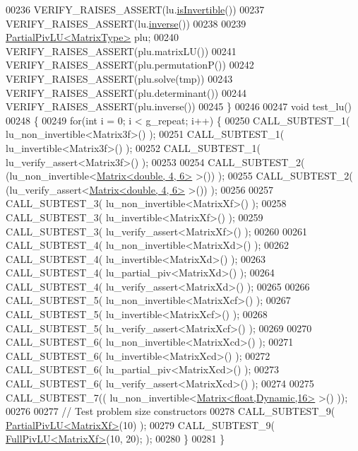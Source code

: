 \begin{DoxyCode}
00236   VERIFY\_RAISES\_ASSERT(lu.\hyperlink{group___l_u___module_afdf2579c93473650f2ef2a47a376c4a0}{isInvertible}())
00237   VERIFY\_RAISES\_ASSERT(lu.\hyperlink{group___l_u___module_ae6f4bb55f859f6353f99cf15ecff4b25}{inverse}())
00238 
00239   \hyperlink{group___l_u___module_class_eigen_1_1_partial_piv_l_u}{PartialPivLU<MatrixType>} plu;
00240   VERIFY\_RAISES\_ASSERT(plu.matrixLU())
00241   VERIFY\_RAISES\_ASSERT(plu.permutationP())
00242   VERIFY\_RAISES\_ASSERT(plu.solve(tmp))
00243   VERIFY\_RAISES\_ASSERT(plu.determinant())
00244   VERIFY\_RAISES\_ASSERT(plu.inverse())
00245 \}
00246 
00247 \textcolor{keywordtype}{void} test\_lu()
00248 \{
00249   \textcolor{keywordflow}{for}(\textcolor{keywordtype}{int} i = 0; i < g\_repeat; i++) \{
00250     CALL\_SUBTEST\_1( lu\_non\_invertible<Matrix3f>() );
00251     CALL\_SUBTEST\_1( lu\_invertible<Matrix3f>() );
00252     CALL\_SUBTEST\_1( lu\_verify\_assert<Matrix3f>() );
00253 
00254     CALL\_SUBTEST\_2( (lu\_non\_invertible<\hyperlink{group___core___module_class_eigen_1_1_matrix}{Matrix<double, 4, 6>} >()) );
00255     CALL\_SUBTEST\_2( (lu\_verify\_assert<\hyperlink{group___core___module_class_eigen_1_1_matrix}{Matrix<double, 4, 6>} >()) );
00256 
00257     CALL\_SUBTEST\_3( lu\_non\_invertible<MatrixXf>() );
00258     CALL\_SUBTEST\_3( lu\_invertible<MatrixXf>() );
00259     CALL\_SUBTEST\_3( lu\_verify\_assert<MatrixXf>() );
00260 
00261     CALL\_SUBTEST\_4( lu\_non\_invertible<MatrixXd>() );
00262     CALL\_SUBTEST\_4( lu\_invertible<MatrixXd>() );
00263     CALL\_SUBTEST\_4( lu\_partial\_piv<MatrixXd>() );
00264     CALL\_SUBTEST\_4( lu\_verify\_assert<MatrixXd>() );
00265 
00266     CALL\_SUBTEST\_5( lu\_non\_invertible<MatrixXcf>() );
00267     CALL\_SUBTEST\_5( lu\_invertible<MatrixXcf>() );
00268     CALL\_SUBTEST\_5( lu\_verify\_assert<MatrixXcf>() );
00269 
00270     CALL\_SUBTEST\_6( lu\_non\_invertible<MatrixXcd>() );
00271     CALL\_SUBTEST\_6( lu\_invertible<MatrixXcd>() );
00272     CALL\_SUBTEST\_6( lu\_partial\_piv<MatrixXcd>() );
00273     CALL\_SUBTEST\_6( lu\_verify\_assert<MatrixXcd>() );
00274 
00275     CALL\_SUBTEST\_7(( lu\_non\_invertible<\hyperlink{group___core___module_class_eigen_1_1_matrix}{Matrix<float,Dynamic,16>} >() ));
00276 
00277     \textcolor{comment}{// Test problem size constructors}
00278     CALL\_SUBTEST\_9( \hyperlink{group___l_u___module_class_eigen_1_1_partial_piv_l_u}{PartialPivLU<MatrixXf>}(10) );
00279     CALL\_SUBTEST\_9( \hyperlink{group___l_u___module_class_eigen_1_1_full_piv_l_u}{FullPivLU<MatrixXf>}(10, 20); );
00280   \}
00281 \}
\end{DoxyCode}
